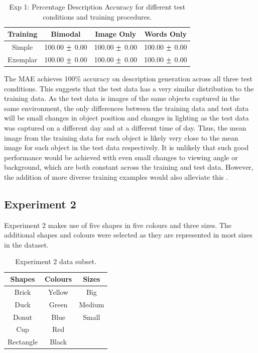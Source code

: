 \begin{table}[h!]
\centering
	\begin{tabular}{|c|c|c|c|}
	\hline
\textbf{Training }	 & 	\textbf{Bimodal} & \textbf{Image Only} 	& 	\textbf{Words Only} \\ \hline
Simple & 100.00 $\mypm$ 0.00 & 100.00 $\mypm$ 0.00 & 100.00 $\mypm$ 0.00 \\ \hline
Exemplar & 100.00 $\mypm$ 0.00 & 100.00 $\mypm$ 0.00 & 100.00 $\mypm$ 0.00 \\ \hline
	\end{tabular}
\caption{Exp 1: Percentage Description Accuracy for different test conditions and training procedures.}
\label{tab:6_res_exp1_acc}
\end{table}

The \ac{MAE} achieves 100\% accuracy on description generation across all three test conditions. This suggests that the test data has a very similar distribution to the training data. As the test data is images of the same objects captured in the same environment, the only differences between the training data and test data will be small changes in object position and  changes in lighting as the test data was captured on a different day and at a different time of day. Thus, the mean image from the training data for each object is likely very close to the mean image for each object in the test data respectively. It is unlikely that such good performance would be achieved with even small changes to viewing angle or background, which are both constant across the training and test data. However, the addition of more diverse training examples would also alleviate this \cite{keller2016analysis, keller}.

\subsection{Experiment 2}

Experiment 2 makes use of five shapes in five colours and three sizes. The additional shapes and colours were selected as they are represented in most sizes in the dataset.

\begin{table}[h]
\centering
\begin{tabular}{|c|c|c|}
\hline

\textbf{Shapes}  & \textbf{Colours} & \textbf{Sizes}\\ \hline \hline
Brick  & Yellow  & Big \\ \hline
Duck   & Green   & Medium \\ \hline
Donut & Blue & Small \\ \hline
Cup  & Red & \\ \hline
Rectangle & Black & \\ \hline

\end{tabular}
\caption{Experiment 2 data subset.}
\label{tab:6_exp2_data} 
\end{table}

